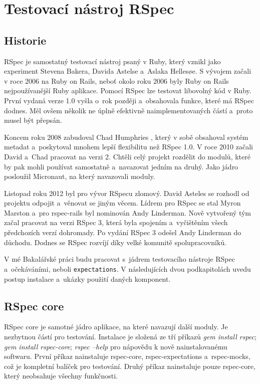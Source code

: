 \section {Testovací nástroj RSpec}
\subsection{Historie}
\par RSpec\cite{davidchelimsky2015} je samostatný testovací nástroj psaný v Ruby, který vznikl jako experiment Stevena Bakera, Davida Astelse a~Aslaka Hellesøe. S vývojem začali v roce 2006 na Ruby on Rails, neboť okolo roku 2006 byly Ruby on Rails nejpoužívanější Ruby aplikace. Pomocí RSpec lze testovat libovolný kód v Ruby. První vydaná verze 1.0 vyšla o~rok později a~obsahovala funkce, které má RSpec dodnes. Měl ovšem několik ne úplně efektivně naimplementovaných částí a~proto musel být přepsán.
\par Koncem roku 2008 zabudoval Chad Humphries , který v sobě obsahoval systém metadat a~poskytoval mnohem lepší flexibilitu než RSpec 1.0. V roce 2010 začali David a~Chad pracovat na verzi 2. Chtěli celý projekt rozdělit do modulů, které by pak mohli používat samostatně a~navazovat jedním na druhý. Jako jádro posloužil Micronaut, na který navazovali moduly.
\par Listopad roku 2012 byl pro vývor RSpecu zlomový. David Asteles se rozhodl od projektu odpojit a~věnovat se jiným věcem. Lídrem pro RSpec se stal Myron Marston a~pro rspec-rails byl nominován Andy Linderman. Nově vytvořený tým začal pracovat na verzi RSpec 3, která byla spojením a~vyčištěním všech předchozích verzí dohromady. Po vydání RSpec 3 odešel Andy Linderman do důchodu. Dodnes se RSpec rozvíjí díky velké komunitě spolupracovníků.
\par V mé Bakalářské práci budu pracovat s~jádrem testovacího nástroje RSpec a~očekáváními, neboli \texttt{expectations}. V následujících dvou podkapitolách uvedu postup instalace a~ukázky použití daných komponent.

\subsection{RSpec core}
\par RSpec core je samotné jádro aplikace, na které navazují další moduly. Je nezbytnou částí pro testování. Instalace je složená ze tří příkazů \textit{gem install rspec}; \textit{gem install rspec-core}; \textit{rspec --help} pro nápovědu k nově nainstalovanému softwaru. První příkaz nainstaluje rspec-core, rspec-expectations a~rspec-mocks, což je kompletní balíček pro testování. Druhý příkaz nainstaluje pouze rspec-core, který neobsahuje všechny funkčnosti. 

